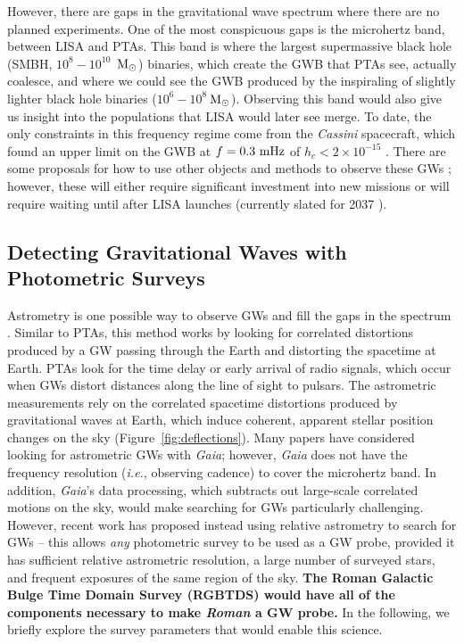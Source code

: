 \documentclass[12pt]{article}
\def\roman{\textit{Roman}\xspace}
\def\gaia{\textit{Gaia}\xspace}
\def\msun{${\rm{M}_\odot}$}
\begin{document}

However, there are gaps in the gravitational wave spectrum where there are no planned experiments. One of the most conspicuous gaps is the microhertz band, between LISA and PTAs. This band is where the largest supermassive black hole (SMBH, $10^8-10^{10}$~\msun) binaries, which create the GWB that PTAs see, actually coalesce, and where we could see the GWB produced by the inspiraling of slightly lighter black hole binaries ($10^6-10^8~$\msun). Observing this band would also give us insight into the populations that LISA would later see merge. To date, the only constraints in this frequency regime come from the \textit{Cassini} spacecraft, which found an upper limit on the GWB at $f=0.3~\rm{mHz}$ of $h_c < 2\times 10^{-15}$ \citep{Armstrong2003}. There are some proposals for how to use other objects and methods to observe these GWs \citep{Fedderke2021, Bustamante-Rosell2022, Sesana2021}; however, these will either require significant investment into new missions or will require waiting until after LISA launches (currently slated for 2037 \citep{LISA_webpage}).


\subsection*{Detecting Gravitational Waves with Photometric Surveys} 
\vspace{-0.1cm}
Astrometry is one possible way to observe GWs and fill the gaps in the spectrum \citep{Book2011, Moore2017, Klioner2018}. Similar to PTAs, this method works by looking for correlated distortions produced by a GW passing through the Earth and distorting the spacetime at Earth. PTAs look for the time delay or early arrival of radio signals, which occur when GWs distort distances along the line of sight to pulsars. The astrometric measurements rely on the correlated spacetime distortions produced by gravitational waves at Earth, which induce coherent, apparent stellar position changes on the sky (Figure~\ref{fig:deflections}). Many papers have considered looking for astrometric GWs with \gaia \citep{Moore2017, Klioner2018}; however, \gaia does not have the frequency resolution (\textit{i.e.}, observing cadence) to cover the microhertz band. In addition, \gaia's data processing, which subtracts out large-scale correlated motions on the sky, would make searching for GWs particularly challenging. However, recent work \citep[][]{Wang2021,Wang2022} has proposed instead using relative astrometry to search for GWs -- this allows \textit{any} photometric survey to be used as a GW probe, provided it has sufficient relative astrometric resolution, a large number of surveyed stars, and frequent exposures of the same region of the sky. {\bf The Roman Galactic Bulge Time Domain Survey (RGBTDS) \citep{Gaudi2019} would have all of the components necessary to make \roman a GW probe.}
In the following, we briefly explore the survey parameters that would enable this science.
\end{document}
